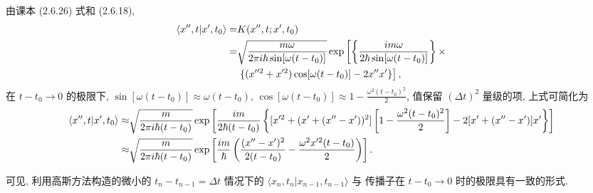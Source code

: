 \documentclass{assignment}
\begin{document}
\begin{sol}
\begin{itemize}
        由课本 (2.6.26) 式和 (2.6.18),
        \begin{align}
            \notag\langle x'',t\vert x',t_0\rangle=&K(x'',t;x',t_0)\\
            \notag=&\sqrt{\frac{m\omega}{2\pi i\hbar\sin[\omega(t-t_0)]}}\exp\left[\left\{\frac{im\omega}{2\hbar\sin[\omega(t-t_0)]}\right\}\times\right.\\
            \notag&\left.\{(x''^2+x'^2)\cos[\omega(t-t_0)]-2x''x'\}\right],
        \end{align}
        在 $t-t_0\rightarrow 0$ 的极限下, $\sin[\omega(t-t_0)]\approx\omega(t-t_0)$, $\cos[\omega(t-t_0)]\approx 1-\frac{\omega^2(t-t_0)^2}{2}$, 值保留 $(\Delta t)^2$ 量级的项, 上式可简化为
        {\small
        \begin{align}
            \notag\langle x'',t\vert x',t_0\rangle\approx&\sqrt{\frac{m}{2\pi i\hbar(t-t_0)}}\exp\left[\frac{im}{2\hbar(t-t_0)}\left\{[x'^2+(x'+(x''-x'))^2]\left[1-\frac{\omega^2(t-t_0)^2}{2}\right]-2[x'+(x''-x')]x'\right\}\right]\\
            \approx&\sqrt{\frac{m}{2\pi i\hbar(t-t_0)}}\exp\left[\frac{im}{\hbar}\left(\frac{(x''-x')^2}{2(t-t_0)}-\frac{\omega^2x'^2(t-t_0)}{2}\right)\right].
        \end{align}
        }

        可见, 利用高斯方法构造的微小的 $t_n-t_{n-1}=\Delta t$ 情况下的 $\langle x_n,t_n\vert x_{n-1},t_{n-1}\rangle$ 与 传播子在 $t-t_0\rightarrow 0$ 时的极限具有一致的形式.
    \end{itemize}
\end{sol}
\end{document}
